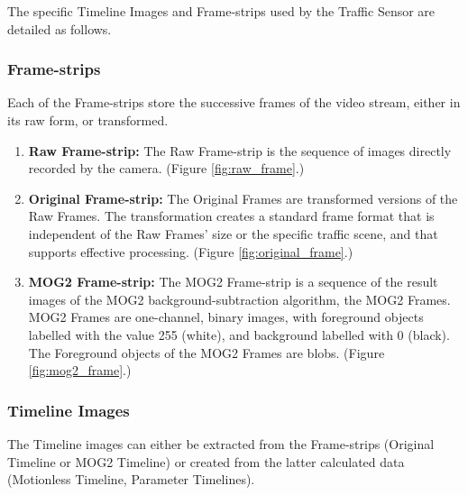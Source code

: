 The specific Timeline Images and Frame-strips used by the Traffic Sensor are detailed as follows.

\subsubsection{Frame-strips}
Each of the Frame-strips store the successive frames of the video stream, either in its raw form, or transformed.
\begin{enumerate}
	\item \textbf{Raw Frame-strip:} The Raw Frame-strip is the sequence of images directly recorded by the camera. (Figure \ref{fig:raw_frame}.)
	
	\item \textbf{Original Frame-strip:} The Original Frames are transformed versions of the Raw Frames. The transformation creates a standard frame format that is independent of the Raw Frames' size or the specific traffic scene, and that supports effective processing. (Figure \ref{fig:original_frame}.)
	
	\item \textbf{MOG2 Frame-strip:} The MOG2 Frame-strip is a sequence of the result images of the MOG2 background-subtraction algorithm, the MOG2 Frames. MOG2 Frames are one-channel, binary images, with foreground objects labelled with the value 255 (white), and background labelled with 0 (black). The Foreground objects of the MOG2 Frames are blobs. (Figure \ref{fig:mog2_frame}.)
\end{enumerate}

\subsubsection{Timeline Images}
The Timeline images can either be extracted from the Frame-strips (Original Timeline or MOG2 Timeline) or created from the latter calculated data (Motionless Timeline, Parameter Timelines).

